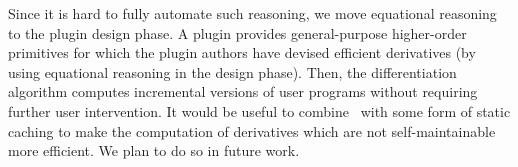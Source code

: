 Since it is hard to fully automate such reasoning, we move
equational reasoning to the plugin design phase. A
plugin provides general-purpose higher-order primitives for which
the plugin authors have devised efficient derivatives (by using
equational reasoning in the design phase). Then, the
differentiation algorithm computes incremental
versions of user programs without requiring further user intervention.
It would be useful to combine \ILC\ with some form of static
caching to make the computation of derivatives which
are not self-maintainable more efficient. We plan to do so
in future work.
%
